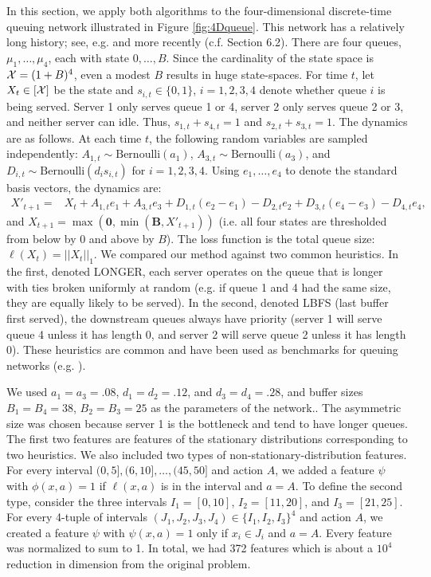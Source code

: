 \documentclass[11pt]{article}
\begin{document}
In this section, we apply both algorithms to the four-dimensional discrete-time queuing network illustrated in Figure \ref{fig:4Dqueue}. This network has a relatively long history; see, e.g. \cite{Rybko-Stolyar-1992} and more recently \cite{DeFarias-VanRoy-2003} (c.f. Section 6.2). There are four queues, $\mu_1,\ldots,\mu_4$, each with state $0,\ldots,B$. Since the cardinality of the state space is ${\cal X}=(1+B)^4$, even a modest $B$ results in huge state-spaces. For time $t$, let $X_t\in [{\cal X}]$ be the state and $s_{i,t}\in\{0,1\}$, $i=1, 2, 3, 4$ denote whether queue $i$ is being served. Server 1 only serves queue 1 or 4, server 2 only serves queue 2 or 3, and neither server can idle. Thus, $s_{1,t}+s_{4,t}=1$ and $s_{2,t}+s_{3,t}=1$. The dynamics are as follows. At each time $t$, the following random variables are sampled independently: $A_{1,t}\sim\text{Bernoulli}(a_1)$, $A_{3,t}\sim\text{Bernoulli}(a_3)$, and $D_{i,t}\sim\text{Bernoulli}(d_i s_{i,t})$ for $i=1,2,3,4$. Using $e_1,\ldots,e_4$ to denote the standard basis vectors, the dynamics are:
\begin{align*}
X'_{t+1}=&X_t+A_{1,t}e_1+A_{3,t}e_3
+D_{1,t}(e_2-e_1)-D_{2,t}e_2
+D_{3,t}(e_4-e_3)-D_{4,t}e_4,
\end{align*}
and $X_{t+1}=\max(\mathbf{0},\min(\mathbf B,X'_{t+1}))$ (i.e. all four states are thresholded from below by 0 and above by $B$).
The loss function is the total queue size: $\ell(X_t)=||X_t||_1$. We compared our method against two common heuristics. In the first, denoted LONGER, each server operates on the queue that is longer with ties broken uniformly at random (e.g. if queue 1 and 4 had the same size, they are equally likely to be served). In the second, denoted LBFS (last buffer first served), the downstream queues always have priority (server 1 will serve queue 4 unless it has length 0, and server 2 will serve queue 2 unless it has length 0). These heuristics are common and have been used as benchmarks for queuing networks (e.g. \cite{DeFarias-VanRoy-2003}).


We used $a_1=a_3=.08$, $d_1=d_2=.12$, and $d_3=d_4=.28$, and buffer sizes $B_1=B_4=38$, $B_2=B_3=25$ as the parameters of the network.. The asymmetric size was chosen because server 1 is the bottleneck and tend to have longer queues. The first two features are features of the stationary distributions corresponding to two heuristics.  We also included two types of non-stationary-distribution features. For every interval $(0,5],(6,10],\ldots,(45,50]$ and action $A$, we added a feature $\psi$ with $\phi(x,a)=1$ if $\ell(x,a)$ is in the interval and $a=A$. To define the second type, consider the three intervals $I_1=[0,10]$, $I_2=[11, 20]$, and $I_3=[21, 25]$. For every 4-tuple of intervals $(J_1,J_2,J_3,J_4)\in\{I_1,I_2,I_3\}^4$ and action $A$, we created a feature $\psi$ with $\psi(x,a)=1$ only if $x_i\in J_i$ and $a=A$. Every feature was normalized to sum to 1. In total, we had 372 features which is about a $10^{4}$ reduction in dimension from the original problem.
\end{document}
